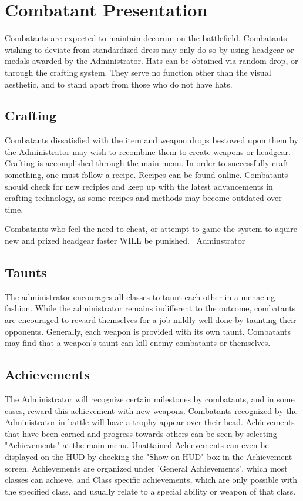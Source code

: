 \section{Combatant Presentation}
Combatants are expected to maintain decorum on the battlefield.  Combatants wishing to deviate from standardized dress may only do so by using headgear or medals awarded by the Administrator. Hats can be obtained via random drop, or through the crafting system. They serve no function other than the visual aesthetic, and to stand apart from those who do not have hats.

\subsection{Crafting}
Combatants dissatisfied with the item and weapon drops bestowed upon them by the Administrator may wish to recombine them to create weapons or headgear.  Crafting is accomplished through the main menu.  In order to successfully craft something, one must follow a recipe.  Recipes can be found online. Combatants should check for new recipies and keep up with the latest advancements in crafting technology, as some recipes and methods may become outdated over time. 

Combatants who feel the need to cheat, or attempt to game the system to aquire new and prized headgear faster WILL be punished. ~Adminstrator

\subsection{Taunts}
The administrator encourages all classes to taunt each other in a menacing fashion. While the administrator remains indifferent to the outcome, combatants are encouraged to reward themselves for a job mildly well done by taunting their opponents. Generally, each weapon is provided with its own taunt. Combatants may find that a weapon's taunt can kill enemy combatants or themselves.
 
\subsection{Achievements}
\label{Achievements}
The Administrator will recognize certain milestones by combatants, and in some cases, reward this achievement with new weapons. Combatants recognized by the Administrator in battle will have a trophy appear over their head. Achievements that have been earned and progress towards others can be seen by selecting "Achievements" at the main menu. Unattained Achievements can even be displayed on the HUD by checking the "Show on HUD" box in the Achievement screen.  Achievements are organized under 'General Achievements', which most classes can achieve, and Class specific achievements, which are only possible with the specified class, and usually relate to a special ability or weapon of that class.